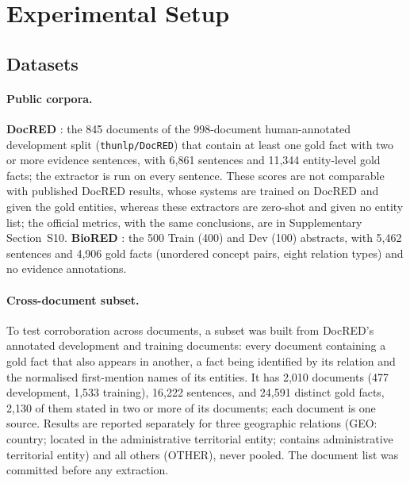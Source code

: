 \documentclass[preprint,12pt,authoryear]{elsarticle}
\begin{document}
\section{Experimental Setup}
\label{sec:experimental-setup}

\subsection{Datasets}
\label{sec:setup-datasets}

\paragraph{Public corpora.} \textbf{DocRED} \citep{yao2019docred}: the
845 documents of the 998-document human-annotated development split
(\texttt{thunlp/DocRED}) that contain at least one gold fact with two or
more evidence sentences, with 6,861 sentences and 11,344 entity-level
gold facts; the extractor is run on every sentence. These scores are not
comparable with published DocRED results, whose systems are trained on
DocRED and given the gold entities, whereas these extractors are
zero-shot and given no entity list; the official metrics, with the same
conclusions, are in Supplementary Section~S10.
\textbf{BioRED} \citep{luo2022biored}: the 500 Train (400) and Dev
(100) abstracts, with 5,462 sentences and 4,906 gold facts (unordered
concept pairs, eight relation types) and no evidence annotations.

\paragraph{Cross-document subset.} To test corroboration across
documents, a subset was built from DocRED's annotated development and
training documents: every document containing a gold fact that also
appears in another, a fact being identified by its relation and the
normalised first-mention names of its entities. It has 2,010 documents
(477 development, 1,533 training), 16,222 sentences, and 24,591 distinct
gold facts, 2,130 of them stated in two or more of its documents; each
document is one source. Results are reported separately for three
geographic relations (GEO: country; located in the administrative
territorial entity; contains administrative territorial entity) and all
others (OTHER), never pooled. The document list was committed before any
extraction.
\end{document}
